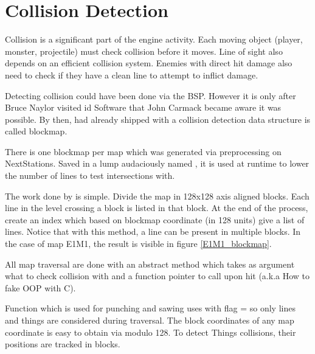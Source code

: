\section{Collision Detection} \label{blockmapdetails}
Collision is a significant part of the engine activity. Each moving object (player, monster, projectile) must check collision before it moves. Line of sight also depends on an efficient collision system. Enemies with direct hit damage also need to check if they have a clean line to attempt to inflict damage.\\
\par
Detecting collision could have been done via the BSP. However it is only after Bruce Naylor visited id Software that John Carmack became aware it was possible. By then, \doom{} had already shipped with a collision detection data structure is called blockmap.\\
\par
{}
\par
There is one blockmap per map which was generated via  preprocessing on NextStations. Saved in a lump audaciously named , it is used at runtime to lower the number of lines to test intersections with.\\
\par
The work done by  is simple. Divide the map in 128x128 axis aligned blocks. Each line in the level crossing a block is listed in that block. At the end of the process, create an index which based on blockmap coordinate (in 128 units) give a list of lines. Notice that with this method, a line can be present in multiple blocks. In the case of map E1M1, the result is visible in figure \ref{E1M1_blockmap}.


All map traversal are done with an abstract method  which takes as argument what to check collision with and a function pointer to call upon hit (a.k.a How to fake OOP with C).\\
\par
{}
\par
Function  which is used for punching and sawing uses  with flag =  so only lines and things are considered during traversal. The block coordinates of any map coordinate is easy to obtain via modulo 128. To detect Things collisions, their positions are tracked in blocks.\\
\par
{}
